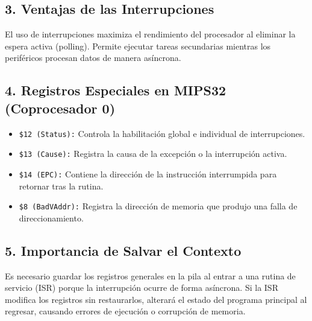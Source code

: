\documentclass[12pt,a4paper]{article}
\begin{document}
\subsection*{3. Ventajas de las Interrupciones}
El uso de interrupciones maximiza el rendimiento del procesador al eliminar la espera activa (polling). Permite ejecutar tareas secundarias mientras los periféricos procesan datos de manera asíncrona.

\subsection*{4. Registros Especiales en MIPS32 (Coprocesador 0)}
\begin{itemize}
    \item \texttt{\$12 (Status):} Controla la habilitación global e individual de interrupciones.
    \item \texttt{\$13 (Cause):} Registra la causa de la excepción o la interrupción activa.
    \item \texttt{\$14 (EPC):} Contiene la dirección de la instrucción interrumpida para retornar tras la rutina.
    \item \texttt{\$8 (BadVAddr):} Registra la dirección de memoria que produjo una falla de direccionamiento.
\end{itemize}

\subsection*{5. Importancia de Salvar el Contexto}
Es necesario guardar los registros generales en la pila al entrar a una rutina de servicio (ISR) porque la interrupción ocurre de forma asíncrona. Si la ISR modifica los registros sin restaurarlos, alterará el estado del programa principal al regresar, causando errores de ejecución o corrupción de memoria.
\end{document}
